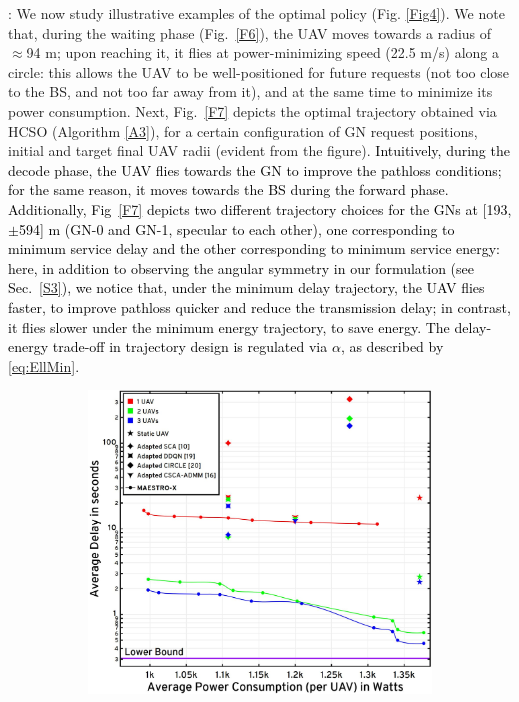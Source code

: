 \documentclass[10pt, twocolumn]{IEEEtran}
\theoremstyle{plain}
\theoremstyle{definition}
\theoremstyle{remark}
\newcommand\hlt[1]{\textcolor{black}{#1}}
\begin{document}
{: We now study illustrative examples of the optimal policy (Fig. \ref{Fig4}). We note that, during the waiting phase (Fig.~\ref{F6}), the UAV moves towards a radius of $\approx$94 m; upon reaching it, it flies at power-minimizing speed (22.5 m/s) along a circle: this allows the UAV to be well-positioned for future requests (not too close to the BS, and not too far away from it), and at the same time to minimize its power consumption. Next, Fig.~\ref{F7} depicts the optimal trajectory obtained via HCSO (Algorithm \ref{A3}), for a certain configuration of GN request positions, initial and target final UAV radii (evident from the figure). \hlt{Intuitively, during the decode phase, the UAV flies towards the GN to improve the pathloss conditions; for the same reason, it moves towards the BS during the forward phase. Additionally, Fig~\ref{F7} depicts two different trajectory choices for the GNs at [193, $\pm$594] m (GN-0 and GN-1, specular to each other), one corresponding to minimum service delay and the other corresponding to minimum service energy: here, in addition to observing the angular symmetry in our formulation (see Sec.~\ref{S3}), we notice that, under the minimum delay trajectory, the UAV flies faster, to improve pathloss quicker and reduce the transmission delay; in contrast, it flies slower under the minimum energy trajectory, to save energy.
The delay-energy trade-off in trajectory design is regulated via $\alpha$, as described by \eqref{eq:EllMin}.}
\begin{figure} [t]
     \begin{subfigure}{0.55\linewidth}
         \centering
         \includegraphics[width=1.0\linewidth]{figs/Delay_Power_10Mb_Scatter_Low_Congestion.jpg}

\end{subfigure}
\end{figure}}
\end{document}
